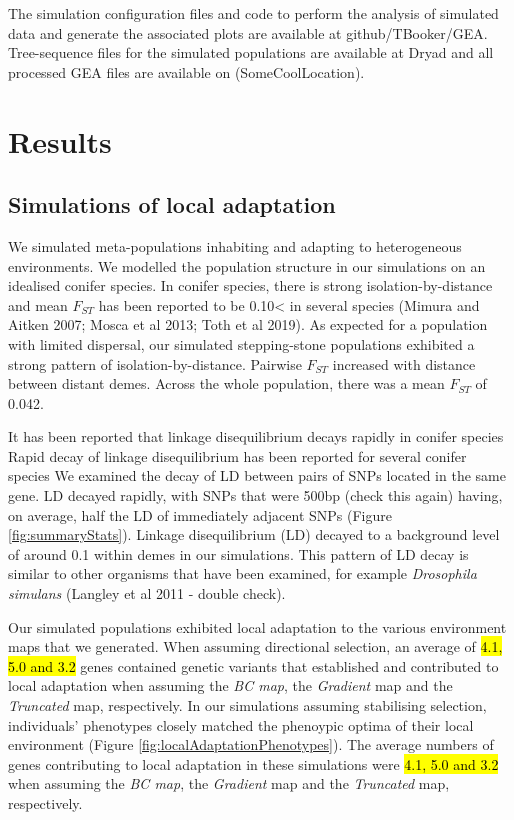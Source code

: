 \documentclass[11pt,twoside,lineno]{GSA_format}
\begin{document}
The simulation configuration files and code to perform the analysis of simulated data and generate the associated plots are available at github/TBooker/GEA. Tree-sequence files for the simulated populations are available at Dryad and all processed GEA files are available on (SomeCoolLocation). 

\section{Results}

\subsection{Simulations of local adaptation}

We simulated meta-populations inhabiting and adapting to heterogeneous environments. We modelled the population structure in our simulations on an idealised conifer species. In conifer species, there is strong isolation-by-distance and mean $F_{ST}$ has been reported to be 0.10< in several species (Mimura and Aitken 2007; Mosca et al 2013; Toth et al 2019). As expected for a population with limited dispersal, our simulated stepping-stone populations exhibited a strong pattern of isolation-by-distance. Pairwise $F_{ST}$ increased with distance between distant demes. Across the whole population, there was a mean $F_{ST}$ of 0.042.

It has been reported that linkage disequilibrium decays rapidly in conifer species
Rapid decay of linkage disequilibrium has been reported for several conifer species
We examined the decay of LD between pairs of SNPs located in the same gene. LD decayed rapidly, with SNPs that were 500bp (check this again) having, on average, half the LD of immediately adjacent SNPs (Figure \ref{fig:summaryStats}). Linkage disequilibrium (LD) decayed to a background level of around 0.1  within demes in our simulations. This pattern of LD decay is similar to other organisms that have been examined, for example \textit{Drosophila simulans} (Langley et al 2011 - double check).

Our simulated populations exhibited local adaptation to the various environment maps that we generated. When assuming directional selection, an average of \hl{ 4.1, 5.0 and 3.2} genes contained genetic variants that established and contributed to local adaptation when assuming the \textit{BC map}, the \textit{Gradient} map and the \textit{Truncated} map, respectively. In our simulations assuming stabilising selection, individuals' phenotypes closely matched the phenoypic optima of their local environment (Figure \ref{fig:localAdaptationPhenotypes}). The average numbers of genes contributing to local adaptation in these simulations were \hl{ 4.1, 5.0 and 3.2} when assuming the \textit{BC map}, the \textit{Gradient} map and the \textit{Truncated} map, respectively.
\end{document}
